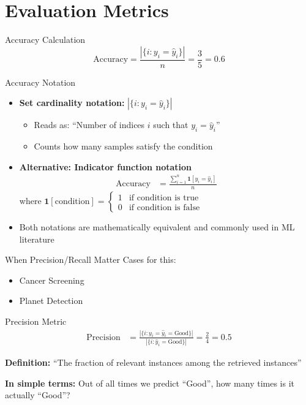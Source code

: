 \documentclass[dvipsnames]{beamer}
\begin{document}
\section{Evaluation Metrics}

\begin{frame}{Accuracy Calculation}
\[
\text{Accuracy} = \frac{|\{i : y_i = \hat{y}_i\}|}{n} = \frac{3}{5} = 0.6
\]
\end{frame}

\begin{frame}{Accuracy Notation}
\begin{itemize}
	\item \textbf{Set cardinality notation:} $|\{i : y_i = \hat{y}_i\}|$ 
	\begin{itemize}
		\item Reads as: ``Number of indices $i$ such that $y_i = \hat{y}_i$''
		\item Counts how many samples satisfy the condition
	\end{itemize}
	
	\item \pause \textbf{Alternative: Indicator function notation}
	\begin{align*}
	\text{Accuracy} &= \frac{\sum_{i=1}^n \mathbf{1}[y_i = \hat{y}_i]}{n}
	\end{align*}
	where $\mathbf{1}[\text{condition}] = \begin{cases} 1 & \text{if condition is true} \\ 0 & \text{if condition is false} \end{cases}$
	
	\item \pause Both notations are mathematically equivalent and commonly used in ML literature
\end{itemize}
\end{frame}

\begin{frame}{When Precision/Recall Matter}
Cases for this:
\begin{itemize}
\item Cancer Screening
\item Planet Detection
\end{itemize}

\end{frame}

\begin{frame}{Precision Metric}
\begin{align*}
\text{Precision} &= \frac{|\{i : y_i = \hat{y}_i = \text{Good}\}|}{|\{i : \hat{y}_i = \text{Good}\}|} = \frac{2}{4} = 0.5
\end{align*}

\textbf{Definition:} ``The fraction of relevant instances among the retrieved instances''

\textbf{In simple terms:} Out of all times we predict ``Good'', how many times is it actually ``Good''?

\end{frame}
\end{document}

